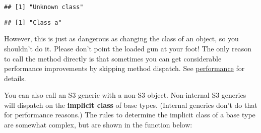 \begin{verbatim}
## [1] "Unknown class"
\end{verbatim}

\begin{Shaded}
\begin{Highlighting}[]
\end{Highlighting}
\end{Shaded}

\begin{verbatim}
## [1] "Class a"
\end{verbatim}

However, this is just as dangerous as changing the class of an object,
so you shouldn't do it. Please don't point the loaded gun at your foot!
The only reason to call the method directly is that sometimes you can
get considerable performance improvements by skipping method dispatch.
See \protect\hyperlink{be-lazy}{performance} for details.

You can also call an S3 generic with a non-S3 object. Non-internal S3
generics will dispatch on the \textbf{implicit class} of base types.
(Internal generics don't do that for performance reasons.) The rules to
determine the implicit class of a base type are somewhat complex, but
are shown in the function below: 

\begin{Shaded}
\begin{Highlighting}[]
\StringTok{ }
  \NormalTok{ (}
    \NormalTok{(}\NormalTok{, } \NormalTok{)}
\NormalTok{  \}}

  \NormalTok{(}
    \NormalTok{ (}\NormalTok{,}
    \NormalTok{ (}\OperatorTok{&&}\StringTok{ }\OperatorTok{!}\NormalTok{,}
    \NormalTok{ (}\NormalTok{,}
    \NormalTok{ (}\NormalTok{,}
\NormalTok{  )}
\NormalTok{\}}
\NormalTok{(}\NormalTok{(}\OperatorTok{:}\NormalTok{))}
\end{Highlighting}
\end{Shaded}

